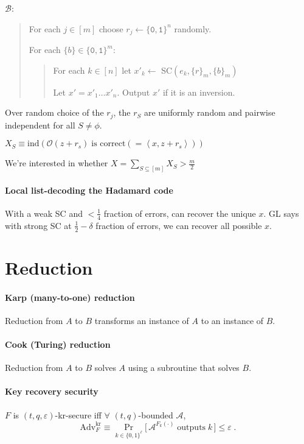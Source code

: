 \documentclass[11pt]{article}
\newcommand{\eqdef}{\ensuremath{\equiv}}
\newcommand{\eps}{\ensuremath{\varepsilon}}
\newcommand{\bit}{\ensuremath{\{\texttt{0},\texttt{1}\}}}
\newcommand{\ang}[1]{\ensuremath{\left\langle#1\right\rangle}}
\newcommand{\BBB}{\ensuremath{\mathcal{B}}}
\newcommand{\OOO}{\ensuremath{\mathcal{O}}}
\theoremstyle{remark}
\begin{document}
$\BBB$:
\begin{quote}
For each $j\in[m]$ choose $r_j\gets\bit^n$ randomly.

For each $\{b\}\in\bit^m$:
\begin{quote}
For each $k\in[n]$ let $x'_k \gets$ SC$(e_k, \{r\}_m, \{b\}_m)$

Let $x' = x'_1 \ldots x'_n$. Output $x'$ if it is an inversion.
\end{quote}
\end{quote}

Over random choice of the $r_j$, the $r_S$ are uniformly random
and pairwise independent for all $S \neq \phi$.

$X_S \eqdef \text{ind}(\OOO(z+r_s)\;\text{is correct}(=\ang{x,z+r_s}))$

We're interested in whether $X=\sum_{S\subseteq[m]} X_S > \frac{m}{2}$

\paragraph{Local list-decoding the Hadamard code}
With a weak SC and $<\frac{1}{4}$ fraction of errors, can recover the unique $x$.
GL says with strong SC at $\frac{1}{2}-\delta$ fraction of errors, we can
recover all possible $x$.

\section{Reduction}

\paragraph{Karp (many-to-one) reduction}
Reduction from $A$ to $B$ transforms
an instance of $A$ to an instance of $B$.

\paragraph{Cook (Turing) reduction}
Reduction from $A$ to $B$ solves $A$
using a subroutine that solves $B$.

\paragraph{Key recovery security}
$F$ is $(t,q,\eps)$-kr-secure
iff $\forall$ $(t,q)$-bounded $\mathcal{A}$,
\[ \textrm{Adv}_F^\textrm{kr} \eqdef
\Pr_{k \in \{0,1\}^\ell} \big[\,
  \mathcal{A}^{F_k(\cdot)}\;\textrm{outputs}\;k
\,\big] \le \eps \;\textrm{.} \]
\end{document}
